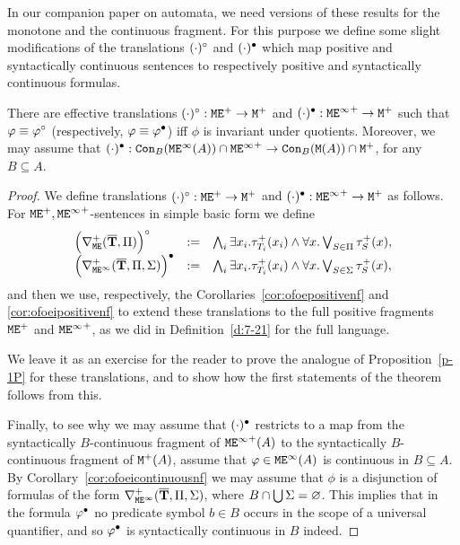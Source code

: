 In our companion paper \cite{companionWEAK} on automata, we need versions of these results for 
the monotone and the continuous fragment.
For this purpose we define some slight modifications of the translations 
$(\cdot)^{\tmoda}$ and $(\cdot)^{\tmodb}$ which map positive and syntactically 
continuous sentences to respectively positive and syntactically continuous 
formulas.

\begin{theorem}
\label{t:inv1}
There are effective translations 
$(\cdot)^{\tmoda}: \ofoe^+ \to \ofo^{+} $
 and 
 $(\cdot)^{\tmodb}: {\ofoei}^+ \to \ofo^+$ 
such that 
$\phi \equiv \phi^{\tmoda}$ (respectively, $\phi \equiv \phi^{\tmodb}$) iff 
$\phi$ is invariant under quotients.
Moreover, we may assume that 
$(\cdot)^{\tmodb}: \cont{{\ofoei}(A)}{B}\cap {\ofoei}^+  \to \cont{\ofo(A)}{B} \cap \ofo^+$,
for any $B \subseteq A$.
\end{theorem}
\begin{proof}

We define translations $(\cdot)^{\tmoda}:\ofoe^+ \to\ofo^+$ and 
$(\cdot)^{\tmodb}: {\ofoei}^+ \to\ofo^+$ as follows. 
For $\ofoe^{+},{\ofoei}^{+}$-sentences in simple basic form we define
\[\begin{array}{lll}
     \Big( \posdbnfofoe{\vlist{T}}{\Pi} \Big)^{\tmoda} 
   & \isdef 
   & \bigwedge_{i} \exists x_i. \tau^+_{T_i}(x_i) 
     \land \forall x. \bigvee_{S\in\Pi} \tau^+_S(x),
\\   \Big( \posdbnfofoei{\vlist{T}}{\Pi}{\Sigma} \Big)^{\tmodb} 
   & \isdef 
   & \bigwedge_{i} \exists x_i. \tau^+_{T_i}(x_i) 
     \land \forall x. \bigvee_{S\in\Sigma} \tau^+_S(x),
\end{array}\]
and then we use, respectively, the Corollaries~\ref{cor:ofoepositivenf} and
\ref{cor:ofoeipositivenf} to extend these translations to the full positive
fragments $\ofoe^{+}$ and ${\ofoei}^{+}$, as we did in Definition~\ref{d:7-21}
for the full language.

We leave it as an exercise for the reader to prove the analogue of 
Proposition~\ref{p-1P} for these translations, and to show how the first
statements of the theorem follows from this.

Finally, to see why we may assume that $(\cdot)^{\tmodb}$ restricts to a map 
from the syntactically $B$-continuous fragment of ${\ofoei}^+(A)$ to the 
syntactically $B$-continuous fragment of ${\ofo}^+(A)$, assume that $\phi 
\in \ofoei(A)$ is continuous in $B \subseteq A$.
By Corollary~\ref{cor:ofoeicontinuousnf} we may assume that $\phi$ is a
disjunction of formulas of the form $\posdbnfofoei{\vlist{T}}{\Pi}{\Sigma}$,
where $B \cap \bigcup \Sigma = \nada$.
This implies that in the formula $\phi^{\tmodb}$ no predicate symbol $b \in
B$ occurs in the scope of a universal quantifier, and so $\phi^{\tmodb}$
is syntactically continuous in $B$ indeed.
\end{proof}

